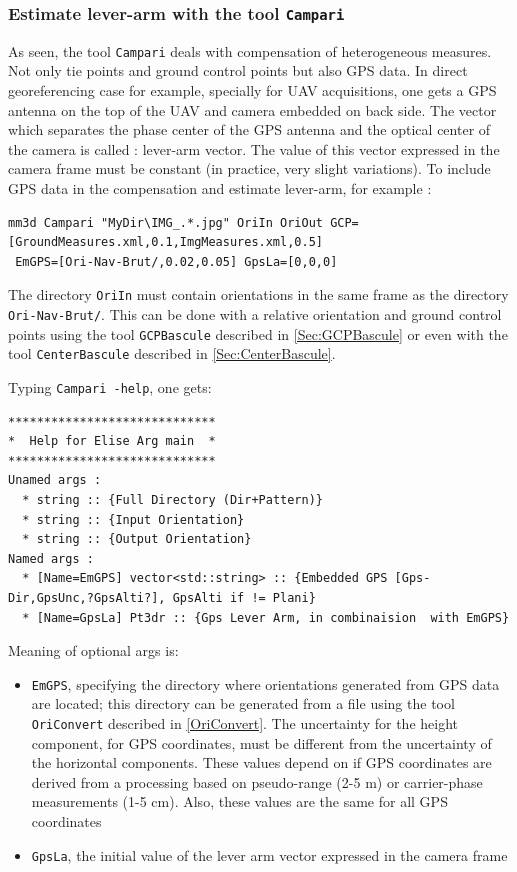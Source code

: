 \subsubsection{Estimate lever-arm with the tool {\tt Campari}}
As seen, the tool {\tt Campari} deals with compensation of heterogeneous measures. Not only tie points
and ground control points but also GPS data. In direct georeferencing case for example, specially for UAV
acquisitions, one gets a GPS antenna on the top of the UAV and camera embedded on back side. The vector which separates
the phase center of the GPS antenna and the optical center of the camera is called : lever-arm vector. The value of
this vector expressed in the camera frame must be constant (in practice, very slight variations).
To include GPS data in the compensation and estimate lever-arm, for example :

\begin{verbatim}
mm3d Campari "MyDir\IMG_.*.jpg" OriIn OriOut GCP=[GroundMeasures.xml,0.1,ImgMeasures.xml,0.5]
 EmGPS=[Ori-Nav-Brut/,0.02,0.05] GpsLa=[0,0,0]
\end{verbatim}

The directory {\tt OriIn} must contain orientations in the same frame as the directory {\tt Ori-Nav-Brut/}. This
can be done with a relative orientation and ground control points using the tool {\tt GCPBascule} described
in \ref{Sec:GCPBascule} or even with the tool {\tt CenterBascule} described in \ref{Sec:CenterBascule}.

\vspace{\baselineskip}
Typing {\tt Campari -help}, one gets:

\begin{verbatim}
*****************************
*  Help for Elise Arg main  *
*****************************
Unamed args :
  * string :: {Full Directory (Dir+Pattern)}
  * string :: {Input Orientation}
  * string :: {Output Orientation}
Named args :
  * [Name=EmGPS] vector<std::string> :: {Embedded GPS [Gps-Dir,GpsUnc,?GpsAlti?], GpsAlti if != Plani}
  * [Name=GpsLa] Pt3dr :: {Gps Lever Arm, in combinaision  with EmGPS}
\end{verbatim}

Meaning of optional args is:

\begin{itemize}
   \item {\tt EmGPS}, specifying the directory where orientations generated from GPS data are located; this directory
   can be generated from a file using the tool {\tt OriConvert} described in \ref{OriConvert}. The uncertainty for the height component,
   for GPS coordinates, must be different from the uncertainty of the horizontal components. These values ​​depend on
   if GPS coordinates are derived from a processing based on pseudo-range (2-5 m) or carrier-phase measurements (1-5 cm). Also, these
   values are the same for all GPS coordinates
   \item {\tt GpsLa}, the initial value of the lever arm vector expressed in the camera frame
\end{itemize}

